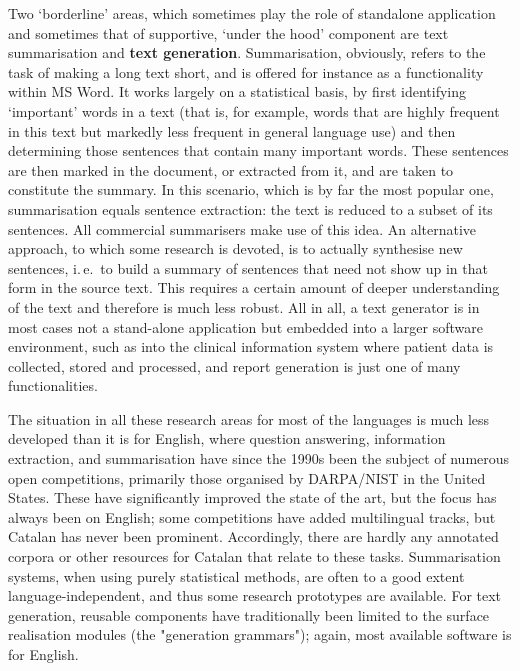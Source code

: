 \begin{multicols}{2}
Two ‘borderline’ areas, which sometimes play the role of standalone application and sometimes that of supportive, ‘under the hood’ component are text summarisation and \textbf{text generation}. Summarisation, obviously, refers to the task of making a long text short, and is offered for instance as a functionality within MS Word. It works largely on a statistical basis, by first identifying ‘important’ words in a text (that is, for example, words that are highly frequent in this text but markedly less frequent in general language use) and then determining those sentences that contain many important words. These sentences are then marked in the document, or extracted from it, and are taken to constitute the summary. In this scenario, which is by far the most popular one, summarisation equals sentence extraction: the text is reduced to a subset of its sentences. All commercial summarisers make use of this idea. An alternative approach, to which some research is devoted, is to actually synthesise new sentences, i.\,e.~to build a summary of sentences that need not show up in that form in the source text. This requires a certain amount of deeper understanding of the text and therefore is much less robust. All in all, a text generator is in most cases not a stand-alone application but embedded into a larger software environment, such as into the clinical information system where patient data is collected, stored and processed, and report generation is just one of many functionalities.


The situation in all these research areas for most of the languages is much less developed than it is for English, where question answering, information extraction, and summarisation have since the 1990s been the subject of numerous open competitions, primarily those organised by DARPA/NIST in the United States. These have significantly improved the state of the art, but the focus has always been on English; some competitions have added multilingual tracks, but Catalan has never been prominent. Accordingly, there are hardly any annotated corpora or other resources for Catalan that relate to these tasks. Summarisation systems, when using purely statistical methods, are often to a good extent language-independent, and thus some research prototypes are available. For text generation, reusable components have traditionally been limited to the surface realisation modules (the "generation grammars"); again, most available software is for English.


\end{multicols}
